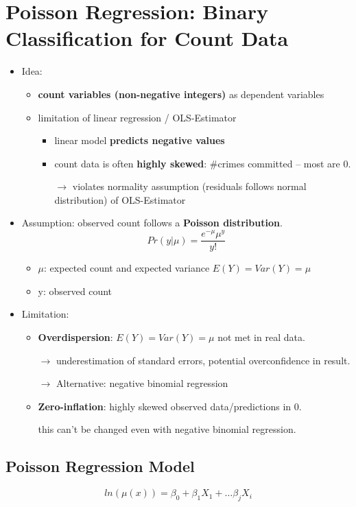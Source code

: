 \section{Poisson Regression: Binary Classification for Count Data}
\begin{itemize}
	\item Idea: 
	\begin{itemize}
		\item \textbf{count variables (non-negative integers)} as dependent variables
		\item limitation of linear regression / OLS-Estimator
		\begin{itemize}
			\item linear model \textbf{predicts negative values}
			\item count data is often \textbf{highly skewed}: \#crimes committed -- most are 0.
			
			$\rightarrow$ violates normality assumption (residuals follows normal distribution) of OLS-Estimator
		\end{itemize}
	\end{itemize}
	\item Assumption: observed count follows a \textbf{Poisson distribution}.
	$$Pr(y|\mu) = \dfrac{e^{-\mu} \mu^y}{y!}$$
	\begin{itemize}
		\item $\mu$: expected count and expected variance $E(Y) = Var(Y) = \mu$
		\item y: observed count
	\end{itemize} 

	\item Limitation:
	\begin{itemize}
		\item \textbf{Overdispersion}: $E(Y) = Var(Y) = \mu$ not met in real data. 
		
		$\rightarrow$ underestimation of standard errors, potential overconfidence in result. 
		
		$\rightarrow$ Alternative: negative binomial regression
		
		\item \textbf{Zero-inflation}: highly skewed observed data/predictions in 0.
		
		this can't be changed even with negative binomial regression.
	\end{itemize}
	
\end{itemize}
\subsection{Poisson Regression Model}
$$ln(\mu(x)) = \beta_0 + \beta_1 X_1 + \dots \beta_j X_i$$
